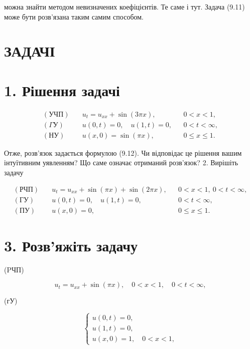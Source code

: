 \documentclass[
  ukrainian,
]{article}
\begin{document}
можна знайти методом невизначених коефіцієнтів. Те саме і тут. Задача
(9.11) може бути розв'язана таким самим способом.

\section{ЗАДАЧІ}\label{ux437ux430ux434ux430ux447ux456}

\section{1. Рішення
задачі}\label{ux440ux456ux448ux435ux43dux43dux44f-ux437ux430ux434ux430ux447ux456}

\[
\begin{aligned}
(\text{УЧП}) \quad & u_t = u_{xx} + \sin(3\pi x), && 0 < x < 1, \\
(\Gamma \text{У}) \quad & u(0,t) = 0,\quad u(1,t) = 0, && 0 < t < \infty, \\
(\text{НУ}) \quad & u(x,0) = \sin(\pi x), && 0 \leqslant x \leqslant 1.
\end{aligned}
\]

Отже, розв'язок задається формулою (9.12). Чи відповідає це рішення
вашим інтуїтивним уявленням? Що саме означає отриманий розв'язок? 2.
Вирішіть задачу

\[
\begin{aligned}
(\text{РЧП})\quad & u_t = u_{xx} + \sin(\pi x) + \sin(2\pi x), && 0 < x < 1,\ 0 < t < \infty,\\
(\text{ГУ})\quad & u(0,t)=0,\quad u(1,t)=0, && 0 < t < \infty,\\
(\text{ПУ})\quad & u(x,0)=0, && 0 \le x \le 1.
\end{aligned}
\]

\section{3. Розв'яжіть
задачу}\label{ux440ux43eux437ux432ux44fux436ux456ux442ux44c-ux437ux430ux434ux430ux447ux443}

(PЧП)

\[
u_t = u_{xx} + \sin(\pi x), \quad 0 < x < 1, \quad 0 < t < \infty,
\]

(гУ)

\[
\begin{cases} u(0, t) = 0, \\ u(1, t) = 0, \\ u(x, 0) = 1, \quad 0 < x < 1, \end{cases}
\]
\end{document}

